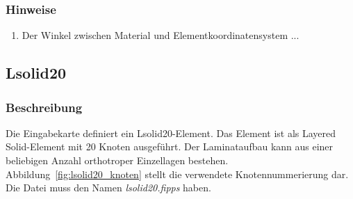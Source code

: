 \documentclass[11pt,titlepage,listof=totoc,bibliography=totoc,twoside]{scrreprt}
\begin{document}
{{\subsubsection{Hinweise}

\begin{enumerate}
\item Der Winkel zwischen Material und Elementkoordinatensystem ...
\end{enumerate}

\newpage

\subsection{Lsolid20}
%
\subsubsection{Beschreibung}
%
Die Eingabekarte definiert ein Lsolid20-Element. Das Element ist als Layered Solid-Element mit 20 Knoten ausgeführt. Der Laminataufbau kann aus einer beliebigen Anzahl orthotroper Einzellagen bestehen. Abbildung~\ref{fig:lsolid20_knoten} stellt die verwendete Knotennummerierung dar.\\
Die Datei muss den Namen \emph{lsolid20.fipps} haben.
%
}}
\end{document}
